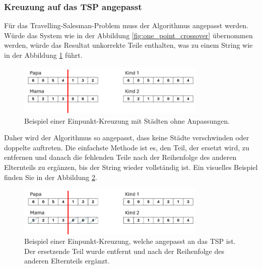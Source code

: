 \subsubsection{Kreuzung auf das TSP angepasst
\label{buch:paper:varalg:subsection:crossover_tsp}}
Für das Travelling-Salesman-Problem muss der Algorithmus angepasst werden.
Würde das System wie in der Abbildung \ref{fig:one_point_crossover} 
übernommen werden, würde das Resultat unkorrekte Teile enthalten, was zu einem 
String wie in der Abbildung \ref{fig:one_point_crossover_cities} führt.
\begin{figure}
	\centering
	\includegraphics[width=0.8\textwidth]{
		papers/varalg/images/teil3/07GeneticStringCitiesCrossoverStandard.png
	}
	\caption{Beispiel einer Einpunkt-Kreuzung mit Städten ohne Anpassungen.}
	\label{fig:one_point_crossover_cities}
\end{figure}
Daher wird der Algorithmus so angepasst, dass keine Städte verschwinden
oder doppelte auftreten. Die einfachste Methode ist es, den Teil, der ersetzt wird,
zu entfernen und danach die fehlenden Teile nach der Reihenfolge des anderen
Elternteils zu ergänzen, bis der String wieder vollständig ist. Ein visuelles Beispiel
finden Sie in der Abbildung \ref{fig:crossover_order_cities}.
\begin{figure}
	\centering
	\includegraphics[width=0.8\textwidth]{
		papers/varalg/images/teil3/08GeneticStringCitiesCrossoverSimple.png
	}
	\caption{
		Beispiel einer Einpunkt-Kreuzung, welche angepasst an das TSP ist. Der ersetzende Teil wurde entfernt und
		nach der Reihenfolge des anderen Elternteils ergänzt.
	}
	\label{fig:crossover_order_cities}
\end{figure}

